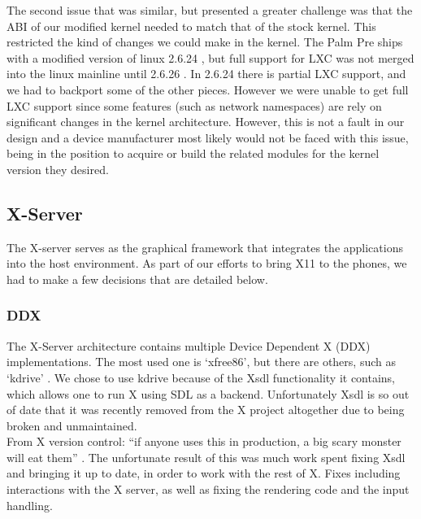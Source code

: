     The second issue that was similar, but presented a greater challenge was that the ABI of our modified kernel needed to match that of the stock kernel. This restricted the kind of changes we could make in the kernel.  The Palm Pre ships with a modified version of linux 2.6.24 \cite{pre_kernel}, but full support for LXC was not merged into the linux mainline until 2.6.26 \cite{lxc_kernel}.  In 2.6.24 there is partial LXC support, and we had to backport some of the other pieces.  However we were unable to get full LXC support since some features (such as network namespaces) are rely on significant changes in the kernel architecture.  However, this is not a fault in our design and a device manufacturer most likely would not be faced with this issue, being in the position to acquire or build the related modules for the kernel version they desired. \\

\subsection{X-Server}

The X-server serves as the graphical framework that integrates the applications into the host environment.  As part of our efforts to bring X11 to the phones, we had to make a few decisions that are detailed below. \\

\subsubsection{DDX}
The X-Server architecture contains multiple Device Dependent X (DDX) implementations.  The most used one is `xfree86', but there are others, such as `kdrive' \cite{x_glossary}.  We chose to use kdrive because of the Xsdl functionality it contains, which allows one to run X using SDL as a backend.  Unfortunately Xsdl is so out of date that it was recently removed from the X project altogether due to being broken and unmaintained. \\

From X version control: ``if anyone uses this in production, a big scary monster will eat them'' \cite{x_quote}.  The unfortunate result of this was much work spent fixing Xsdl and bringing it up to date, in order to work with the rest of X.  Fixes including interactions with the X server, as well as fixing the rendering code and the input handling. \\

